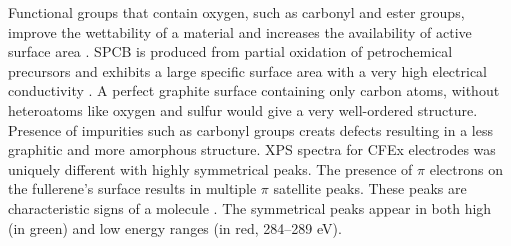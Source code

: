 \documentclass{article}
\begin{document}
Functional groups that contain oxygen, such as carbonyl and ester groups, improve the wettability of a material and increases the availability of active surface area \cite{younesi_analysis_2015}. SPCB is produced from partial oxidation of petrochemical precursors and exhibits a large specific surface area with a very high electrical conductivity \cite{gnanamuthu_electrochemical_2011}. A perfect graphite surface containing only carbon atoms, without heteroatoms like oxygen and sulfur would give a very well-ordered structure. Presence of impurities such as carbonyl groups creats defects resulting in a less graphitic and more amorphous structure\cite{hao_carbonaceous_2013}. 
XPS spectra for CFEx electrodes was uniquely different with highly symmetrical peaks. The presence of $\pi$ electrons on the fullerene's surface results in  multiple $\pi$ satellite peaks. These peaks are characteristic signs of a  molecule \cite{skryleva_xps_2016}. The symmetrical peaks appear in both high (in green) and low energy ranges (in red, 284–289 eV)\cite{erbahar_spectromicroscopy_2016, poirier_carbon_1993}. 
\end{document}
